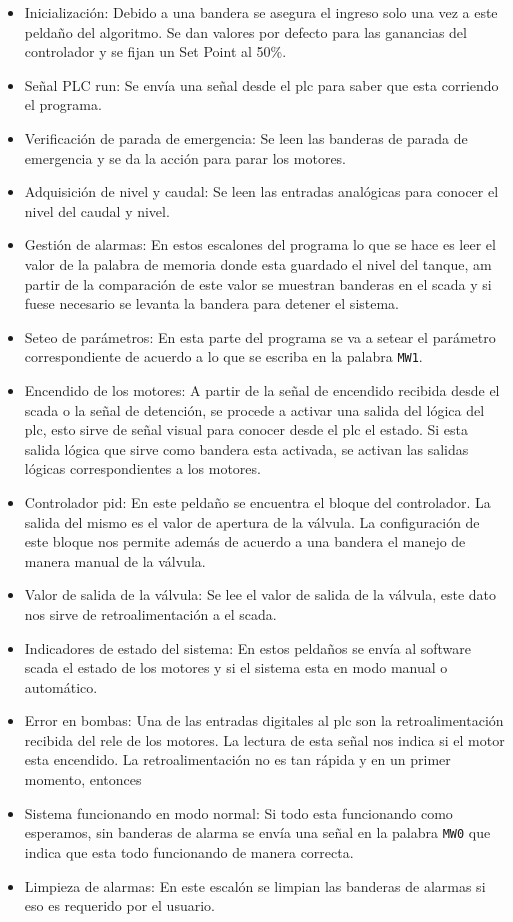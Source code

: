 \begin{itemize}
 \item Inicialización: Debido a una bandera se asegura el ingreso solo una vez a
 este peldaño del algoritmo. Se dan valores por defecto para las ganancias del 
 controlador y se fijan un Set Point al 50\%.
 \item Señal PLC run: Se envía una señal desde el \gls{plc} para saber que esta
 corriendo el programa.
 \item Verificación de parada de emergencia: Se leen las banderas de parada de 
 emergencia y se da la acción para parar los motores.
  \item Adquisición de nivel y caudal: Se leen las entradas analógicas para conocer
  el nivel del caudal y nivel.
  \item Gestión de alarmas: En estos escalones del programa lo que se hace es leer
  el valor de la palabra de memoria donde esta guardado el nivel del tanque, am partir
  de la comparación de este valor se muestran banderas en el \gls{scada} y si fuese 
  necesario se levanta la bandera para detener el sistema.
  \item Seteo de parámetros: En esta parte del programa se va a setear el parámetro
  correspondiente de acuerdo a lo que se escriba en la palabra \verb|MW1|.
  \item Encendido de los motores: A partir de la señal de encendido recibida desde el
  \gls{scada} o la señal de detención, se procede a activar una salida del lógica del
  \gls{plc}, esto sirve de señal visual para conocer desde el \gls{plc} el estado. 
  Si esta salida lógica que sirve como bandera esta activada, se activan las salidas
  lógicas correspondientes a los motores.
  \item Controlador \gls{pid}: En este peldaño se encuentra el bloque del controlador.
  La salida del mismo es el valor de apertura de la válvula.  
  La configuración de este bloque nos permite además de acuerdo a una bandera el manejo
  de manera manual de la válvula.
  \item Valor de salida de la válvula: Se lee el valor de salida de la válvula, este dato 
  nos sirve de retroalimentación a el \gls{scada}.
  \item Indicadores de estado del sistema: En estos peldaños se envía al software \gls{scada}
  el estado de los motores y si el sistema esta en modo manual o automático.
  \item Error en bombas: Una de las entradas digitales al \gls{plc} son la retroalimentación 
  recibida del rele de los motores. La lectura de esta señal nos indica si el motor esta 
  encendido. La retroalimentación no es tan rápida y en un primer momento, entonces 
  \item Sistema funcionando en modo normal: Si todo esta funcionando como esperamos, sin banderas
  de alarma se envía una señal en la palabra \verb|MW0| que indica que esta todo funcionando
  de manera correcta.
  \item Limpieza de alarmas: En este escalón se limpian las banderas de alarmas si eso es requerido
  por el usuario.
  
\end{itemize}


